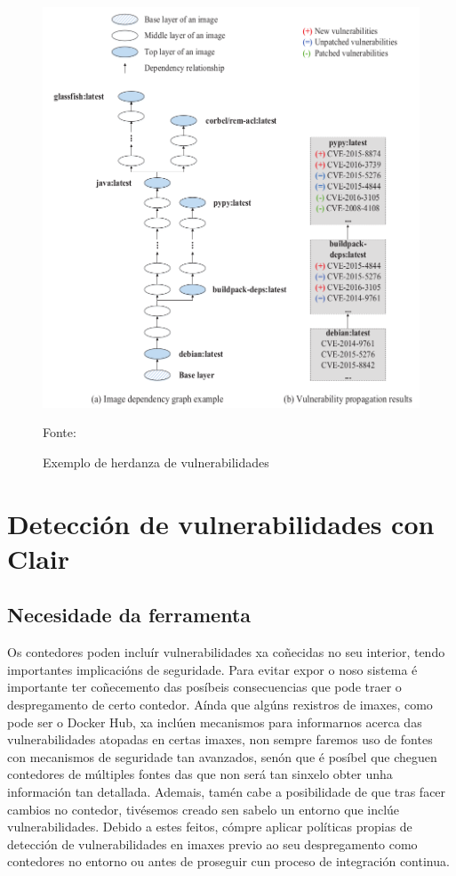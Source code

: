 \begin{figure}
\centerline{\includegraphics[width=15cm]{figuras/herdanzaVulnerabilidades.png}}
\caption{Exemplo de herdanza de vulnerabilidades}
\medskip
\small
\centerline{Fonte: \cite{studySecurityDockerHub}}
\label{herdanzaVulnerabilidades}
\end{figure}

\section{Detección de vulnerabilidades con Clair}

\subsection{Necesidade da ferramenta}

Os contedores poden incluír vulnerabilidades xa coñecidas no seu interior, tendo importantes implicacións de seguridade. Para evitar expor o noso sistema é importante ter coñecemento das posíbeis consecuencias que pode traer o despregamento de certo contedor. Aínda que algúns rexistros de imaxes, como pode ser o Docker Hub, xa inclúen mecanismos para informarnos acerca das vulnerabilidades atopadas en certas imaxes, non sempre faremos uso de fontes con mecanismos de seguridade tan avanzados, senón que é posíbel que cheguen contedores de múltiples fontes das que non será tan sinxelo obter unha información tan detallada. Ademais, tamén cabe a posibilidade de que tras facer cambios no contedor, tivésemos creado sen sabelo un entorno que inclúe vulnerabilidades. Debido a estes feitos, cómpre aplicar políticas propias de detección de vulnerabilidades en imaxes previo ao seu despregamento como contedores no entorno ou antes de proseguir cun proceso de integración continua.\\

